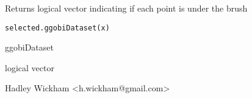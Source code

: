 \begin{Description}\relax
Returns logical vector indicating if each point is under the brush
\end{Description}
\begin{Usage}
\begin{verbatim}selected.ggobiDataset(x)\end{verbatim}
\end{Usage}
\begin{Arguments}
\begin{ldescription}
\item[\code{x}] ggobiDataset
\item[\code{}] 
\end{ldescription}
{logical vector}
\end{Arguments}
\begin{Details}\relax
\end{Details}
\begin{Author}\relax
Hadley Wickham <h.wickham@gmail.com>
\end{Author}
\begin{Examples}
\begin{ExampleCode}\end{ExampleCode}
\end{Examples}

